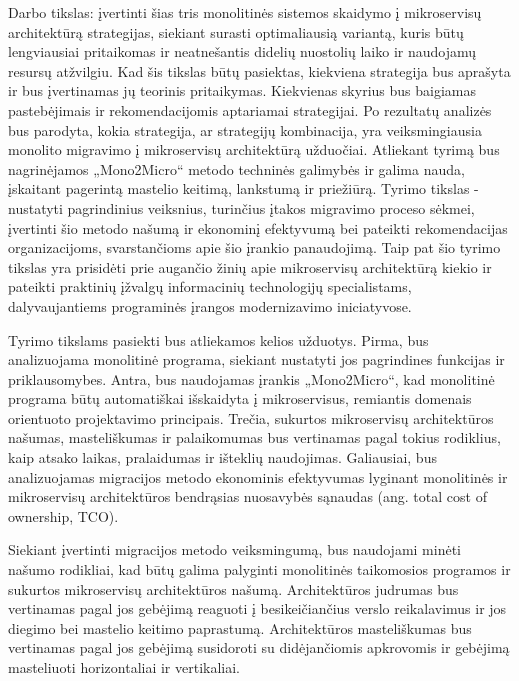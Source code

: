 \documentclass{VUMIFPSbakalaurinis}
\begin{document}
Darbo tikslas: įvertinti šias tris monolitinės sistemos skaidymo į mikroservisų architektūrą strategijas, siekiant surasti optimaliausią variantą, kuris būtų lengviausiai pritaikomas ir neatnešantis didelių nuostolių laiko ir naudojamų resursų atžvilgiu. Kad šis tikslas būtų pasiektas, kiekviena strategija bus aprašyta ir bus įvertinamas jų teorinis pritaikymas. Kiekvienas skyrius bus baigiamas pastebėjimais ir rekomendacijomis aptariamai strategijai. Po rezultatų analizės bus parodyta, kokia strategija, ar strategijų kombinacija, yra veiksmingiausia monolito migravimo į mikroservisų architektūrą užduočiai. Atliekant tyrimą bus nagrinėjamos „Mono2Micro“ metodo techninės galimybės ir galima nauda, įskaitant pagerintą mastelio keitimą, lankstumą ir priežiūrą. Tyrimo tikslas - nustatyti pagrindinius veiksnius, turinčius įtakos migravimo proceso sėkmei, įvertinti šio metodo našumą ir ekonominį efektyvumą bei pateikti rekomendacijas organizacijoms, svarstančioms apie šio įrankio panaudojimą. Taip pat šio tyrimo tikslas yra prisidėti prie augančio žinių apie mikroservisų architektūrą kiekio ir pateikti praktinių įžvalgų informacinių technologijų specialistams, dalyvaujantiems programinės įrangos modernizavimo iniciatyvose.

Tyrimo tikslams pasiekti bus atliekamos kelios užduotys. Pirma, bus analizuojama monolitinė programa, siekiant nustatyti jos pagrindines funkcijas ir priklausomybes. Antra, bus naudojamas įrankis „Mono2Micro“, kad monolitinė programa būtų automatiškai išskaidyta į mikroservisus, remiantis domenais orientuoto projektavimo principais. Trečia, sukurtos mikroservisų architektūros našumas, masteliškumas ir palaikomumas bus vertinamas pagal tokius rodiklius, kaip atsako laikas, pralaidumas ir išteklių naudojimas. Galiausiai, bus analizuojamas migracijos metodo ekonominis efektyvumas lyginant monolitinės ir mikroservisų architektūros bendrąsias nuosavybės sąnaudas (ang. total cost of ownership, TCO). 

Siekiant įvertinti migracijos metodo veiksmingumą, bus naudojami minėti našumo rodikliai, kad būtų galima palyginti monolitinės taikomosios programos ir sukurtos mikroservisų architektūros našumą. Architektūros judrumas bus vertinamas pagal jos gebėjimą reaguoti į besikeičiančius verslo reikalavimus ir jos diegimo bei mastelio keitimo paprastumą. Architektūros masteliškumas bus vertinamas pagal jos gebėjimą susidoroti su didėjančiomis apkrovomis ir gebėjimą masteliuoti horizontaliai ir vertikaliai.
\end{document}
